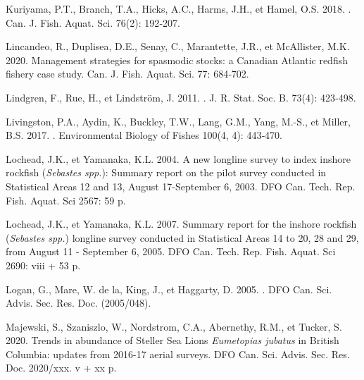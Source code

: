 \documentclass[french,11pt]{book}
\begin{document}
\begin{CSLReferences}{1}{0}
%
Kuriyama, P.T., Branch, T.A., Hicks, A.C., Harms, J.H., et Hamel, O.S. 2018. . Can. J. Fish. Aquat. Sci. 76(2): 192‑207.

%
Lincandeo, R., Duplisea, D.E., Senay, C., Marantette, J.R., et McAllister, M.K. 2020. Management strategies for spasmodic stocks: a {Canadian Atlantic} redfish fishery case study. Can. J. Fish. Aquat. Sci. 77: 684‑702.

%
Lindgren, F., Rue, H., et Lindström, J. 2011. . J. R. Stat. Soc. B. 73(4): 423‑498.

%
Livingston, P.A., Aydin, K., Buckley, T.W., Lang, G.M., Yang, M.-S., et Miller, B.S. 2017. . Environmental Biology of Fishes 100(4, 4): 443‑470.

%
Lochead, J.K., et Yamanaka, K.L. 2004. A new longline survey to index inshore rockfish ({\emph{Sebastes spp.}}): Summary report on the pilot survey conducted in Statistical Areas 12 and 13, {August} 17-{September} 6, 2003. DFO Can. Tech. Rep. Fish. Aquat. Sci 2567: 59 p.

%
Lochead, J.K., et Yamanaka, K.L. 2007. Summary report for the inshore rockfish ({\emph{Sebastes spp.}}) longline survey conducted in Statistical Areas 14 to 20, 28 and 29, from August 11 - September 6, 2005. DFO Can. Tech. Rep. Fish. Aquat. Sci 2690: viii + 53 p.

%
Logan, G., Mare, W. de la, King, J., et Haggarty, D. 2005. . DFO Can. Sci. Advis. Sec. Res. Doc. (2005/048).

%
Majewski, S., Szaniszlo, W., Nordstrom, C.A., Abernethy, R.M., et Tucker, S. 2020. Trends in abundance of {Steller Sea Lions} {\emph{Eumetopias jubatus}} in {British Columbia}: updates from 2016-17 aerial surveys. DFO Can. Sci. Advis. Sec. Res. Doc. 2020/xxx. v + xx p.


\end{CSLReferences}
\end{document}
